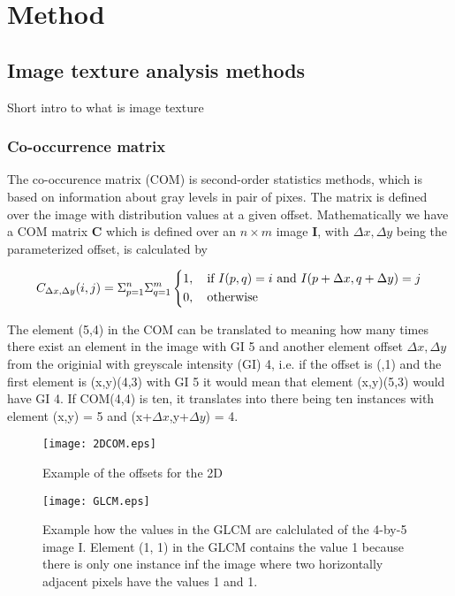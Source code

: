 \chapter{Method}


\section{Image texture analysis methods}

Short intro to what is image texture

\subsection{Co-occurrence matrix}


The co-occurence matrix (COM) is second-order statistics methods, which is based on information about gray levels in pair of pixes. The matrix is defined over the image with distribution values at a given offset. Mathematically we have a COM matrix \textbf{C} which is defined over an $n \times m$ image \textbf{I}, with $\Delta x, \Delta y$ being the parameterized offset, is calculated by

\[
C_{\Delta x, \Delta y}(i, j) = \Sigma_{p=1}^n\Sigma_{q=1}^m
\begin{dcases}
  1, \quad \text{if } I(p,q)=i \text{ and } I(p+\Delta x, q+ \Delta y) =j \\
  0, \quad \text{otherwise}
\end{dcases}
\]

The element (5,4) in the COM can be translated to meaning how many times there exist an element in the image with GI  5 and another element offset $\Delta x, \Delta y$ from the originial with greyscale intensity  (GI) 4, i.e. if the offset is (,1) and the first element is {(x,y)(4,3)} with GI 5 it would mean that element (x,y)(5,3) would have GI 4. If COM(4,4) is ten, it translates into there being ten instances with element (x,y) = 5 and (x+$\Delta x$,y+$\Delta y$) = 4.

\begin{figure}[H]
  \centering
  \texttt{[image: 2DCOM.eps]}
  \caption{Example of the offsets for the 2D}\label{2DCOM}
\end{figure}

\begin{figure}[H]
  \centering
  \texttt{[image: GLCM.eps]}
  \caption{Example how the values in the GLCM are calclulated of the 4-by-5 image I. Element (1, 1) in the GLCM contains the value 1 because there is only one instance inf the image where two horizontally adjacent pixels have the values 1 and 1.}\label{GLCM}
\end{figure}


